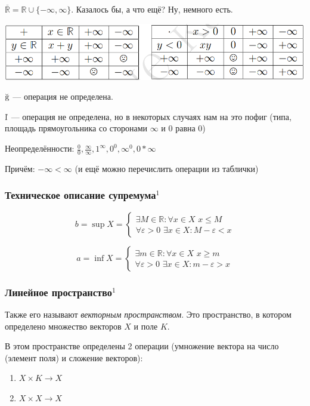 \documentclass{article}
\def\dbl{\,\,}
\begin{document}
$\overline{\mathbb{R}} = \mathbb{R} \cup \{-\infty, \infty\}$. Казалось бы, а что ещё? Ну, немного есть.

\includegraphics[scale=0.55]{../images/added_R.png}

$\Frowny$ --- операция не определена.

$\Smiley$ --- операция не определена, но в некоторых случаях нам на это пофиг (типа, площадь прямоугольника со сторонами $\infty$ и 0 равна 0)

Неопределённости: $\frac{0}{0}, \frac{\infty}{\infty}, 1^\infty, 0^0, \infty^0, 0 * \infty$

Причём: $-\infty < \infty$ (и ещё можно перечислить операции из таблички)

\subsubsection{Техническое описание супремума\texorpdfstring{$^1$}{}}
$$
b = \sup X = 
\begin{cases}
\exists M \in \mathbb{R} : \forall x \in X \dbl x \le M\\
\forall \varepsilon > 0 \dbl \exists x \in X : M - \varepsilon < x
\end{cases} 
$$

$$
a = \inf X = 
\begin{cases}
\exists m \in \mathbb{R} : \forall x \in X \dbl x \ge m\\
\forall \varepsilon > 0 \dbl \exists x \in X : m - \varepsilon > x
\end{cases} 
$$

\subsubsection{Линейное пространство\texorpdfstring{$^1$}{}}
Также его называют \textit{векторным пространством}. Это пространство, в котором определено множество векторов $X$ и поле $K$.

В этом пространстве определены 2 операции (умножение вектора на число (элемент поля) и сложение векторов):
\begin{enumerate}
    \item $X\times K \rightarrow X$
    \item $X\times X \rightarrow X$
\end{enumerate}
\end{document}

